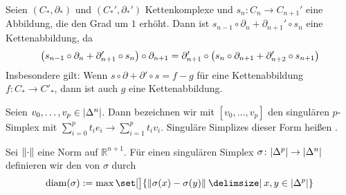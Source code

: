 \begin{bemerkung}[{name=[{Abbildungen $s_n \colon C_n \to C_{n+1}'$, die den Rang erhöhen}]}]
	Seien $(C_*,\partial_*)$ und $(C_*',\partial_*')$ Kettenkomplexe und $s_n \colon C_n \to C_{n+1}'$ eine Abbildung, die den Grad um $1$ erhöht. 
	Dann ist $s_{n-1} \circ \partial_n + \partial_{n+1}' \circ s_n$ eine Kettenabbildung, da
	\[
		\enbrace*{s_{n-1} \circ \partial_n + \partial_{n+1}' \circ s_n} \circ \partial_{n+1} = \partial_{n+1}' \circ  \enbrace*{s_n \circ \partial_{n+1} 
		+ \partial_{n+2}' \circ s_{n+1}}  
	\]
	Insbesondere gilt: Wenn $s \circ \partial + \partial' \circ s = f -g$ für eine Kettenabbildung $f \colon C_* \to C'_*$, dann ist auch $g$ eine Kettenabbildung.
\end{bemerkung}

\begin{definition}[{name=[{Affiner singulärer Simplex}]}]
	Seien $v_0, \ldots ,v_p \in \abs*{\Delta^n}$. 
	Dann bezeichnen wir mit $[v_0,\ldots ,v_p]$ den singulären $p$-Simplex mit $\sum_{i=0}^{p} t_i e_i \to \sum_{i=1}^{p} t_i v_i$.
	Singuläre Simplizes dieser Form heißen .
\end{definition}

\begin{definition}[{name=[{Durchmesser eines singulären Simplizes $\abs*{\Delta^p} \to \abs*{\Delta^n}$}]}]
	Sei $\norm{\cdot}$ eine Norm auf $\mathbb{R}^{n+1}$. 
	Für einen singulären Simplex $\sigma \colon \abs*{\Delta^p} \to \abs*{\Delta^n}$ definieren wir den  von $\sigma$ durch
	\[
		\diam(\sigma) := \max \set[\big]{\norm{\sigma(x)- \sigma(y)}  \given x,y \in \abs*{\Delta^p}} 
	\]
\end{definition}

